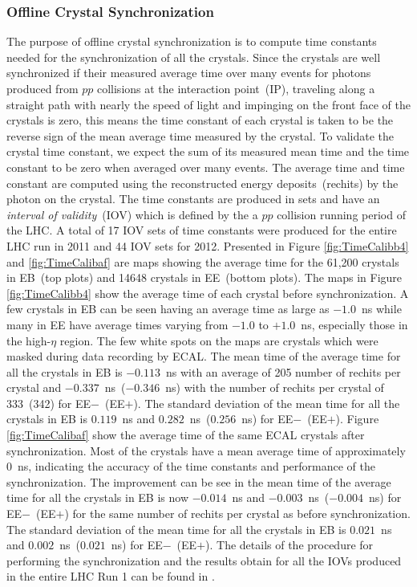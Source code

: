 \subsubsection{Offline Crystal Synchronization}
The purpose of offline crystal synchronization is to compute time constants needed for the synchronization of all the crystals. Since the crystals are well synchronized if their measured average time over many events for photons produced from $pp$ collisions at the interaction point~(IP), traveling along a straight path with nearly the speed of light and impinging on the front face of the crystals is zero, this means the time constant of each crystal is taken to be the reverse sign of the mean average time measured by the crystal. To validate the crystal time constant, we expect the sum of its measured mean time and the time constant to be zero when averaged over many events. The average time and time constant are computed using the reconstructed energy deposits~(rechits) by the photon on the crystal.
The time constants are produced in sets and have an \textit{interval of validity}~(IOV) which is defined by the a $pp$ collision running period of the LHC. A total of 17 IOV sets of time constants were produced for the entire LHC run in 2011 and 44 IOV sets for 2012. Presented in Figure \ref{fig:TimeCalibb4} and \ref{fig:TimeCalibaf} are maps showing the average time for the 61,200 crystals in EB~(top plots) and 14648 crystals in EE~(bottom plots). The maps in Figure \ref{fig:TimeCalibb4} show the average time of each crystal before synchronization. A few crystals in EB can be seen having an average time as large as $-1.0$~ns while many in EE have average times varying from $-1.0$ to $+1.0$~ns, especially those in the high-$\eta$ region. The few white spots on the maps are crystals which were masked during data recording by ECAL. The mean time of the average time for all the crystals in EB is $-0.113$~ns with an average of 205 number of rechits per crystal and $-0.337$~ns~($-0.346$~ns) with the number of rechits per crystal of 333~(342) for EE$-$~(EE$+$). The standard deviation of the mean time for all the crystals in EB is $0.119$~ns and $0.282$~ns~($0.256$~ns) for EE$-$~(EE$+$).
\newline 
Figure \ref{fig:TimeCalibaf} show the average time of the same ECAL crystals after synchronization. Most of the crystals have a mean average time of approximately $0$~ns, indicating the accuracy of the time constants and performance of the synchronization. The improvement can be see in the mean time of the average time for all the crystals in EB is now $-0.014$~ns and $-0.003$~ns~($-0.004$~ns) for EE$-$~(EE$+$) for the same number of rechits per crystal as before synchronization.  The standard deviation of the mean time for all the crystals in EB is $0.021$~ns and $0.002$~ns~($0.021$~ns) for EE$-$~(EE$+$).
\newline
The details of the procedure for performing the synchronization and the results obtain for all the IOVs produced in the entire LHC Run 1 can be found in \cite{ECALCAL}.

